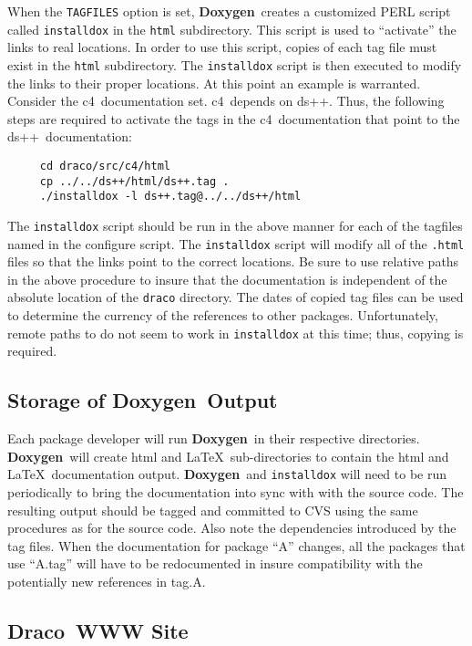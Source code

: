 \documentclass[11pt]{nmemo}
\newcommand{\draco}{{\normalfont\sffamily Draco}}
\newcommand{\doxy}{{\normalfont\bfseries Doxygen}}
\newcommand{\dsxx}{{\normalfont\sffamily ds++}}
\newcommand{\cfour}{{\normalfont\sffamily c4}}
\begin{document}
When the \texttt{TAGFILES} option is set, \doxy\ creates a customized
PERL script called \texttt{installdox} in the \texttt{html}
subdirectory.  This script is used to ``activate'' the links to real
locations.  In order to use this script, copies of each tag file must
exist in the \texttt{html} subdirectory.  The \texttt{installdox}
script is then executed to modify the links to their proper locations.
At this point an example is warranted.  Consider the \cfour\ 
documentation set.  \cfour\ depends on \dsxx.  Thus, the following
steps are required to activate the tags in the \cfour\ documentation
that point to the \dsxx\ documentation:
\begin{verbatim}
     cd draco/src/c4/html
     cp ../../ds++/html/ds++.tag .
     ./installdox -l ds++.tag@../../ds++/html
\end{verbatim}
 The \texttt{installdox} script should be run in the above manner for each
of the tagfiles named in the configure script.
The \texttt{installdox} script will modify all of the \texttt{.html}
files so that the links point to the correct locations.  Be sure to 
use relative paths in the above procedure to insure that the 
documentation is independent of the
absolute location of the \texttt{draco} directory.  The dates of
copied tag files
can be used to determine the currency of the references to other packages.
Unfortunately, remote paths to do not seem to work in
\texttt{installdox} at this time; thus, copying is required.

\subsection{Storage of \doxy\ Output}

Each package developer will run \doxy\ in their respective
directories.  \doxy\ will create html and \LaTeX\ sub-directories to
contain the html and \LaTeX\ documentation output. \doxy\ and
\texttt{installdox} will need to
be run periodically to bring the documentation into sync with with the
source code. The resulting output should be tagged and committed to
CVS using the same procedures as for the source code. Also note the
dependencies introduced by the tag files.
When the documentation for package ``A'' changes, all the packages
that use ``A.tag'' will have to be redocumented in insure compatibility
with the potentially new references in tag.A.

\subsection{\draco\ WWW Site}
\end{document}
